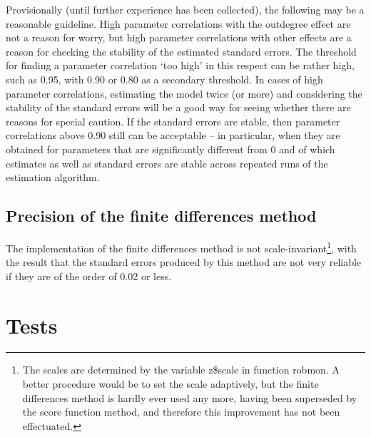\documentclass[a4paper,fleqn,11pt]{article}
\newcommand{\+}{\, + \,}
\newcommand{\sfn}[1]{\textsf{#1}}
\begin{document}
Provisionally (until further experience has been collected),
the following may be a reasonable guideline.
High parameter correlations with the outdegree effect are not a
reason for worry, but high parameter correlations with other effects are
a reason for checking the stability of the estimated standard errors. The
threshold for finding a parameter correlation `too high' in this respect
can be rather high, such as 0.95, with 0.90 or 0.80 as a secondary threshold.
In cases of high parameter correlations, estimating the model twice
(or more) and considering the stability of the standard errors will be
a good way for seeing whether there are reasons for special caution.
If the standard errors are stable, then parameter correlations above
0.90 still can be acceptable -- in particular, when they are obtained
for parameters that are significantly different from 0 and of which
estimates as well as standard errors are stable across repeated runs of
the estimation algorithm.

\subsection{Precision of the finite differences method}

The implementation of the finite differences method is not
scale-invariant\footnote{The scales are determined by the
variable \sfn{z\$scale} in function \sfn{robmon}.
A better procedure would be to set the scale adaptively,
but the finite differences method is hardly ever used any more,
having been superseded by the score function method,
and therefore this improvement has not been effectuated.},
with the result that the standard errors produced by this method
are not very reliable if they are of the order of 0.02 or less.

\newpage
\section{Tests}
\label{S_test}
\end{document}

